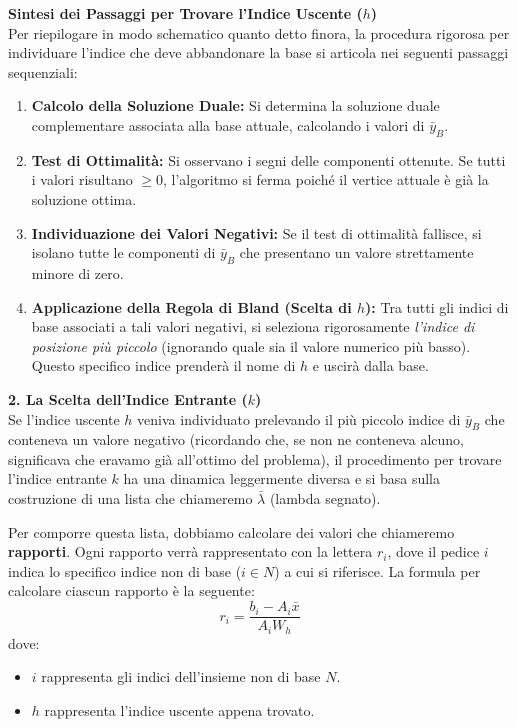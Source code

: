 \documentclass[12pt, a4paper]{article}
\begin{document}
	\vspace{0.4cm}
	\textbf{Sintesi dei Passaggi per Trovare l'Indice Uscente ($h$)}\\
	Per riepilogare in modo schematico quanto detto finora, la procedura rigorosa per individuare l'indice che deve abbandonare la base si articola nei seguenti passaggi sequenziali:
	
	\begin{enumerate}
		\item \textbf{Calcolo della Soluzione Duale:} Si determina la soluzione duale complementare associata alla base attuale, calcolando i valori di $\bar{y}_B$.
		\item \textbf{Test di Ottimalità:} Si osservano i segni delle componenti ottenute. Se tutti i valori risultano $\geq 0$, l'algoritmo si ferma poiché il vertice attuale è già la soluzione ottima.
		\item \textbf{Individuazione dei Valori Negativi:} Se il test di ottimalità fallisce, si isolano tutte le componenti di $\bar{y}_B$ che presentano un valore strettamente minore di zero.
		\item \textbf{Applicazione della Regola di Bland (Scelta di $h$):} Tra tutti gli indici di base associati a tali valori negativi, si seleziona rigorosamente \textit{l'indice di posizione più piccolo} (ignorando quale sia il valore numerico più basso). Questo specifico indice prenderà il nome di $h$ e uscirà dalla base.
	\end{enumerate}
	
	\vspace{0.6cm}
	\textbf{2. La Scelta dell'Indice Entrante ($k$)}\\
	Se l'indice uscente $h$ veniva individuato prelevando il più piccolo indice di $\bar{y}_B$ che conteneva un valore negativo (ricordando che, se non ne conteneva alcuno, significava che eravamo già all'ottimo del problema), il procedimento per trovare l'indice entrante $k$ ha una dinamica leggermente diversa e si basa sulla costruzione di una lista che chiameremo $\bar{\lambda}$ (lambda segnato).
	
	Per comporre questa lista, dobbiamo calcolare dei valori che chiameremo \textbf{rapporti}. Ogni rapporto verrà rappresentato con la lettera $r_i$, dove il pedice $i$ indica lo specifico indice non di base ($i \in N$) a cui si riferisce. La formula per calcolare ciascun rapporto è la seguente:
	\[
	r_i = \frac{b_i - A_i \bar{x}}{A_i W_h}
	\]
	dove:
	\begin{itemize}[label=\textcolor{titlecolor}{\Large\textbullet}, itemsep=2pt, leftmargin=1.5cm]
		\item $i$ rappresenta gli indici dell'insieme non di base $N$.
		\item $h$ rappresenta l'indice uscente appena trovato.
	\end{itemize}
	
\end{document}
